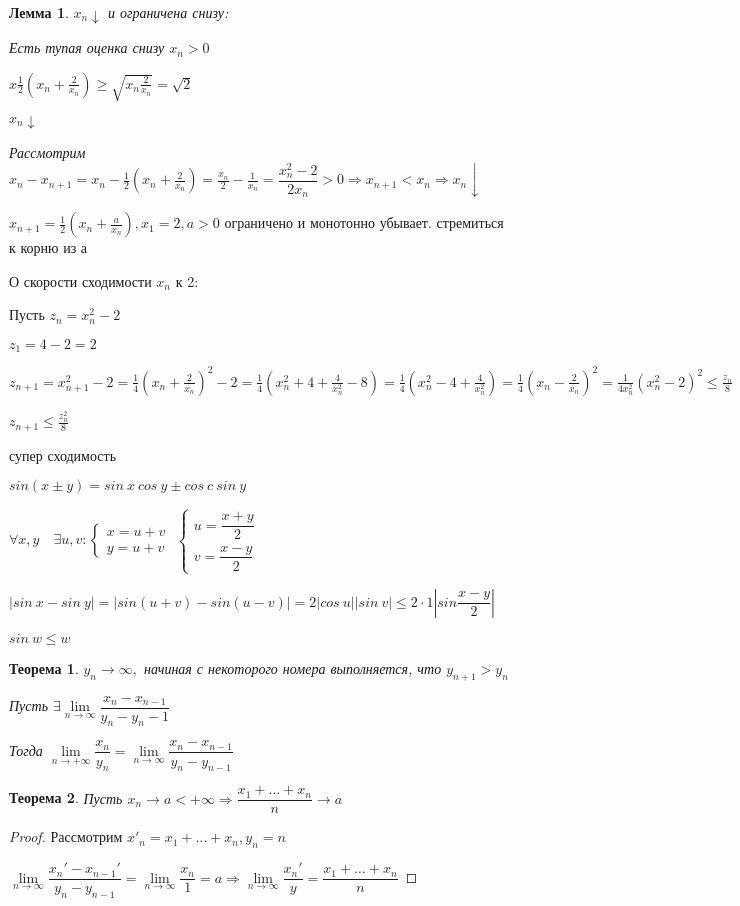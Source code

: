 \documentclass{book}
\newtheorem{Th}{Теорема}[chapter]
\newtheorem{Lm}{Лемма}[chapter]
\begin{document}
\begin{Lm}
	$x_n\downarrow$ и ограничена снизу:
	
	Есть тупая оценка снизу $x_n>0$
	
	$x\frac{1}{2}(x_n+\frac{2}{x_n})\geqslant \sqrt{x_n\frac{2}{x_n}}=\sqrt{2}$
	
	$x_n\downarrow$
	
	Рассмотрим $x_n-x_{n+1}=x_n-\frac{1}{2}(x_n+\frac{2}{x_n})=\frac{x_n}{2}-\frac{1}{x_n}= \dfrac{x_n^2-2}{2x_n}>0\Rightarrow x_{n+1}<x_n\Rightarrow x_n\downarrow$
\end{Lm}

$x_{n+1}=\frac{1}{2}(x_n+\frac{a}{x_n}), x_1=2, a>0$ ограничено и монотонно убывает. стремиться к корню из а

О скорости сходимости $x_n$ к 2:

Пусть $z_n = x_n^2-2$

$z_1=4-2=2$

$z_{n+1}=x_{n+1}^2-2=\frac{1}{4}(x_n+\frac{2}{x_n})^2-2=\frac{1}{4}(x_n^2+4+\frac{4}{x_n^2}-8)=\frac{1}{4}(x_n^2-4+\frac{4}{x_n^2})=\frac{1}{4}(x_n-\frac{2}{x_n})^2=\frac{1}{4x_n^2}(x_n^2-2)^2\leqslant\frac{z_n}{8}$

$z_{n+1}\leqslant\frac{z_n^2}{8}$

супер сходимость


$sin(x \pm y)= sin~x~cos~y \pm cos~c~sin~y$

$\forall x, y \quad \exists u, v:
\begin{cases}
x=u+v\\
y=u+v
\end{cases}
$
$
\begin{cases}
u = \dfrac{x+y}{2}\\
v = \dfrac{x-y}{2}
\end{cases}$

$|sin~x-sin~y|=|sin(u+v)-sin(u-v)|=2|cos~u||sin~v|\leqslant 2\cdot 1 |sin\dfrac{x-y}{2}|$

$sin~w \leqslant w$

\begin{Th}
$y_n\to \infty, $ начиная с некоторого номера выполняется, что $y_{n+1}>y_n$

Пусть $\exists \lim\limits_{n\to \infty}\dfrac{x_n-x_{n-1}}{y_n-y_n-1}$

Тогда $\lim\limits_{n\to +\infty}\dfrac{x_n}{y_n} = \lim\limits_{n\to \infty}\dfrac{x_n-x_{n-1}}{y_n-y_{n-1}}$ 
\end{Th}

\begin{Th}
Пусть $x_n\to a<+\infty\Rightarrow \dfrac{x_1+\hdots+x_n}{n}\to a$
\end{Th}
\begin{proof}
Рассмотрим $x'_n=x_1+\hdots+x_n, y_n = n$

$\lim\limits_{n\to \infty}\dfrac{x_n'-x_{n-1}'}{y_n-y_{n-1}}=\lim\limits_{n\to \infty}\dfrac{x_n}{1}=a\Rightarrow \lim\limits_{n\to\infty}\dfrac{x_n'}{y}=\dfrac{x_1+\hdots+x_n}{n}$
\end{proof}
\end{document}
